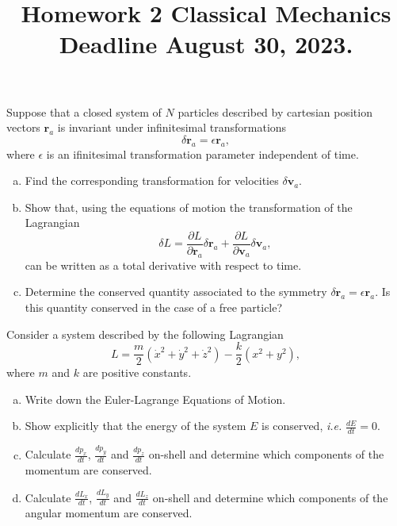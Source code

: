 \documentclass[12pt]{article}
\newenvironment{problem}[2][Problem]{\begin{trivlist}
\item[\hskip \labelsep {\bfseries #1}\hskip \labelsep {\bfseries #2.}]}{\end{trivlist}}
\begin{document}
 
 
\title{Homework 2 Classical Mechanics\\Deadline August 30, 2023.}
\date{}
 
\maketitle

\begin{problem}{1} Suppose that a closed system of $N$ particles described by cartesian position vectors $\mathbf{r}_a$ is invariant under infinitesimal transformations
\begin{equation}
\delta\mathbf{r}_a=\epsilon \mathbf{r}_a,
\end{equation}
where $\epsilon$ is an ifinitesimal transformation parameter independent of time.
\begin{enumerate}[(a)]
\item Find the corresponding transformation for velocities $\delta\mathbf{v}_a$.
\item Show that, using the equations of motion the transformation of the Lagrangian
\begin{equation}
\delta L=\frac{\partial L}{\partial \mathbf{r}_a}\delta\mathbf{r}_a+\frac{\partial L}{\partial \mathbf{v}_a}\delta\mathbf{v}_a,
\end{equation}
can be written as a total derivative with respect to time.
\item Determine the conserved quantity associated to the symmetry $\delta\mathbf{r}_a=\epsilon \mathbf{r}_a$. Is this quantity conserved in the case of a free particle?
\end{enumerate}
\end{problem}


\begin{problem}{2} Consider a system described by the following Lagrangian
\begin{equation}
L=\frac{m}{2}(\dot{x}^2+\dot{y}^2+\dot{z}^2)-\frac{k}{2}(x^2+y^2),
\end{equation}
where $m$ and $k$ are positive constants.
\begin{enumerate}[(a)]
\item Write down the Euler-Lagrange Equations of Motion.
\item Show explicitly that the energy of the system $E$ is conserved, \emph{i.e.} $\frac{dE}{dt}=0$.
\item Calculate $\frac{dp_x}{dt}$, $\frac{dp_y}{dt}$ and $\frac{dp_z}{dt}$ on-shell and determine which components of the momentum are conserved.
\item Calculate $\frac{dL_x}{dt}$, $\frac{dL_y}{dt}$ and $\frac{dL_z}{dt}$ on-shell and determine which components of the angular momentum are conserved.\end{enumerate}
\end{problem}
\end{document}
